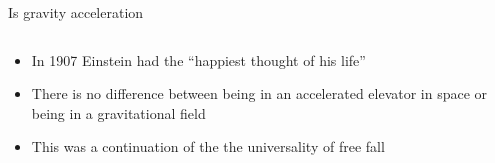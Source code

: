 \documentclass{beamer}
\begin{document}
\begin{frame}{Is gravity acceleration}
  \begin{columns}
    \begin{column}{0.5\textwidth}
      \begin{itemize}
      \item{In 1907 Einstein had the ``happiest thought of his life''}
      \item<2->{There is no difference between being in an accelerated elevator in space or being in a gravitational field}
      \item<4->{This was a continuation of the the universality of free fall}
         
        \end{itemize}
         \end{column}

    \begin{column}{0.5\textwidth}
\end{column}
\end{columns}
\end{frame}
\end{document}
